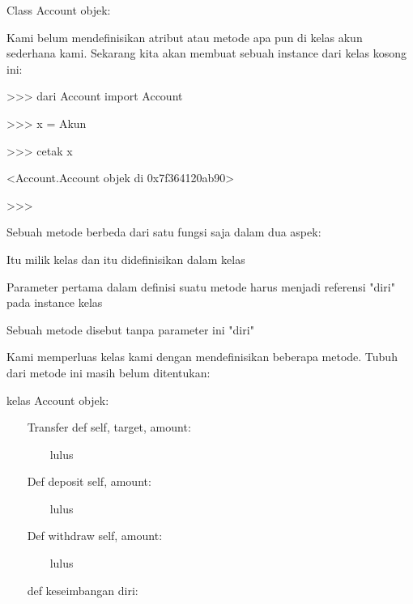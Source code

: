 \begin{12pt}
\begin{12pt}
\begin{12pt}
\begin{12pt}
\begin{12pt}
\begin{12pt}
\begin{12pt}
\begin{12pt}
\begin{12pt}
\begin{12pt}
\begin{12pt}
\begin{12pt}
\begin{12pt}
\begin{12pt}
\begin{12pt}
\begin{12pt}
\begin{12pt}
\begin{12pt}
\begin{12pt}
\begin{12pt}
\begin{12pt}
\begin{12pt}
\begin{12pt}
\begin{12pt}
{\begin{12pt}
\begin{12pt}
\noindent 
Class Account {objek}: \par
\vspace{12pt}
\noindent 
Kami belum mendefinisikan atribut atau metode apa pun di kelas akun sederhana kami. Sekarang kita akan membuat sebuah instance dari kelas kosong ini: \par
\vspace{12pt}
\vspace{12pt}
\vspace{12pt}
\vspace{12pt}
\noindent 
>>> dari Account import Account \par
\noindent 
>>> x = Akun {} \par
\noindent 
>>> cetak x \par
\noindent 
<Account.Account objek di 0x7f364120ab90> \par
\noindent 
>>> \par
\vspace{12pt}
\noindent 
Sebuah metode berbeda dari satu fungsi saja dalam dua aspek: \par
\noindent 
Itu milik kelas dan itu didefinisikan dalam kelas \par
\noindent 
Parameter pertama dalam definisi suatu metode harus menjadi referensi "diri" pada instance kelas \par
\noindent 
Sebuah metode disebut tanpa parameter ini "diri" \par
\vspace{12pt}
Kami memperluas kelas kami dengan mendefinisikan beberapa metode. Tubuh dari metode ini masih belum ditentukan: \par
\vspace{12pt}
\noindent 
kelas Account {objek}: \par
\vspace{12pt}
\noindent 
~~~ Transfer def {self, target, amount}: \par
\noindent 
~~~~~~~ lulus \par
\noindent 
  \par
\noindent 
~~~ Def deposit {self, amount}: \par
\noindent 
~~~~~~~ lulus \par
\noindent 
  \par
\noindent 
~~~ Def withdraw {self, amount}: \par
\noindent 
~~~~~~~ lulus \par
\noindent 
  \par
\noindent 
~~~ def keseimbangan {diri}: \par

\end{12pt}
\end{12pt}}
\end{12pt}
\end{12pt}
\end{12pt}
\end{12pt}
\end{12pt}
\end{12pt}
\end{12pt}
\end{12pt}
\end{12pt}
\end{12pt}
\end{12pt}
\end{12pt}
\end{12pt}
\end{12pt}
\end{12pt}
\end{12pt}
\end{12pt}
\end{12pt}
\end{12pt}
\end{12pt}
\end{12pt}
\end{12pt}
\end{12pt}
\end{12pt}
